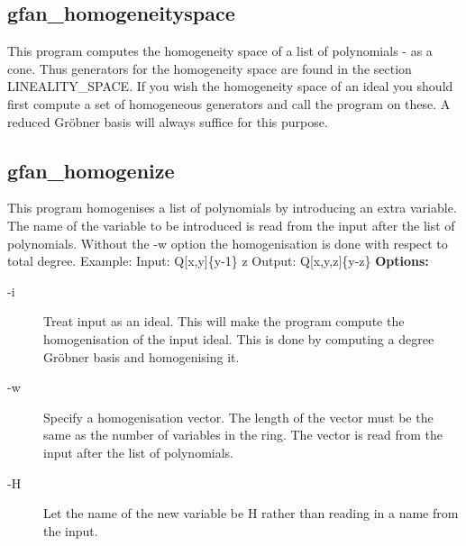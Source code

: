 {{{{{{{{{{{{{\subsection{gfan\_homogeneityspace}\label{applist:_homogeneityspace}
This program computes the homogeneity space of a list of polynomials - as a cone. Thus generators for the homogeneity space are found in the section LINEALITY\_SPACE. If you wish the homogeneity space of an ideal you should first compute a set of homogeneous generators and call the program on these. A reduced Gr\"obner basis will always suffice for this purpose.


{\subsection{gfan\_homogenize}\label{applist:_homogenize}
This program homogenises a list of polynomials by introducing an extra variable. The name of the variable to be introduced is read from the input after the list of polynomials. Without the -w option the homogenisation is done with respect to total degree.
Example:
Input:
Q[x,y]\{y-1\}
z
Output:
Q[x,y,z]\{y-z\}
\newline
{\bf Options:}
\begin{description}
\item[-i]Treat input as an ideal. This will make the program compute the homogenisation of the input ideal. This is done by computing a degree Gr\"obner basis and homogenising it.\item[-w]Specify a homogenisation vector. The length of the vector must be the same as the number of variables in the ring. The vector is read from the input after the list of polynomials.
\item[-H]Let the name of the new variable be H rather than reading in a name from the input.\end{description}


}}}}}}}}}}}}}}
